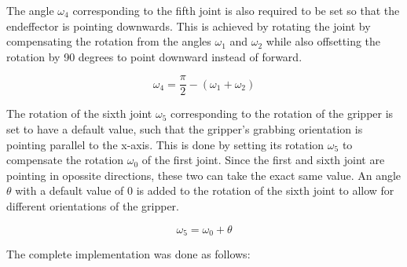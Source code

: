 The angle $\omega_4$ corresponding to the fifth joint is also required to be set so that the endeffector is pointing downwards. This is achieved by rotating the joint by compensating the rotation from the angles $\omega_1$ and $\omega_2$ while also offsetting the rotation by 90 degrees to point downward instead of forward.

$$\omega_4 = \frac{\pi}{2} - (\omega_1 + \omega_2)$$

The rotation of the sixth joint $\omega_5$ corresponding to the rotation of the gripper is set to have a default value, such that the gripper's grabbing orientation is pointing parallel to the x-axis. This is done by setting its rotation $\omega_5$ to compensate the rotation $\omega_0$ of the first joint. Since the first and sixth joint are pointing in opossite directions, these two can take the exact same value. An angle $\theta$ with a default value of $0$ is added to the rotation of the sixth joint to allow for different orientations of the gripper.

$$\omega_5 = \omega_0 + \theta$$


The complete implementation was done as follows:

